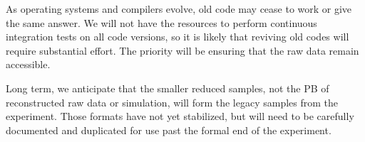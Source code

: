 \documentclass[../main-v1.tex]{subfiles}
\begin{document}
As operating systems and compilers evolve, old code may cease to work or give the same answer.  We will not have the resources to perform continuous integration tests on all code versions, so it is likely that reviving old codes will require substantial effort. The priority will be ensuring that the raw data remain accessible. 

Long term, we anticipate that the smaller reduced samples, not the PB of reconstructed raw data or simulation, will form the legacy samples from the experiment.  Those formats have not yet stabilized, but will need to be carefully documented and duplicated for use past the formal end of the experiment.



\end{document}
